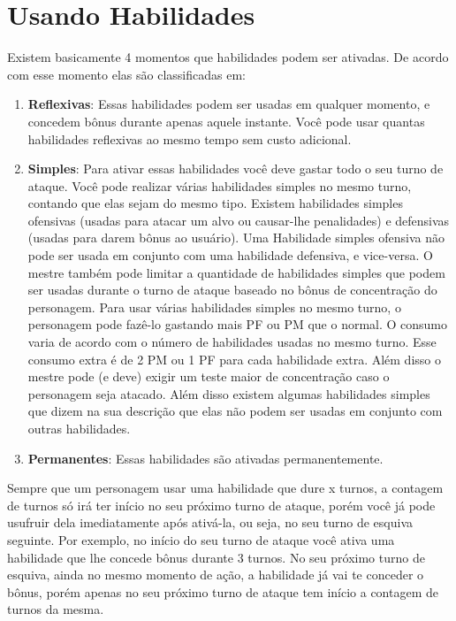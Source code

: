 \section{Usando Habilidades}

Existem basicamente 4 momentos que habilidades podem ser ativadas. De acordo com esse momento elas são classificadas em:

\begin{enumerate}

\item \textbf{Reflexivas}: Essas habilidades podem ser usadas em qualquer momento, e concedem bônus durante apenas aquele instante. Você pode usar quantas habilidades reflexivas ao mesmo tempo sem custo adicional.

\item \textbf{Simples}: Para ativar essas habilidades você deve gastar todo o seu turno de ataque. Você pode realizar várias habilidades simples no mesmo turno, contando que elas sejam do mesmo tipo. Existem habilidades simples ofensivas (usadas para atacar um alvo ou causar-lhe penalidades) e defensivas (usadas para darem bônus ao usuário). Uma Habilidade simples ofensiva não pode ser usada em conjunto com uma habilidade defensiva, e vice-versa. O mestre também pode limitar a quantidade de habilidades simples que podem ser usadas durante o turno de ataque baseado no bônus de concentração do personagem. Para usar várias habilidades simples no mesmo turno, o personagem pode fazê-lo gastando mais PF ou PM que o normal. O consumo varia de acordo com o número de habilidades usadas no mesmo turno. Esse consumo extra é de 2 PM ou 1 PF para cada habilidade extra. Além disso o mestre pode (e deve) exigir um teste maior de concentração caso o personagem seja atacado. Além disso existem algumas habilidades simples que dizem na sua descrição que elas não podem ser usadas em conjunto com outras habilidades.

\item \textbf{Permanentes}: Essas habilidades são ativadas permanentemente. 

\end{enumerate}

Sempre que um personagem usar uma habilidade que dure x turnos, a contagem de turnos só irá ter início no seu próximo turno de ataque, porém você já pode usufruir dela imediatamente após ativá-la, ou seja, no seu turno de esquiva seguinte. Por exemplo, no início do seu turno de ataque você ativa uma habilidade que lhe concede bônus durante 3 turnos. No seu próximo turno de esquiva, ainda no mesmo momento de ação, a habilidade já vai te conceder o bônus, porém apenas no seu próximo turno de ataque tem início a contagem de turnos da mesma. 

